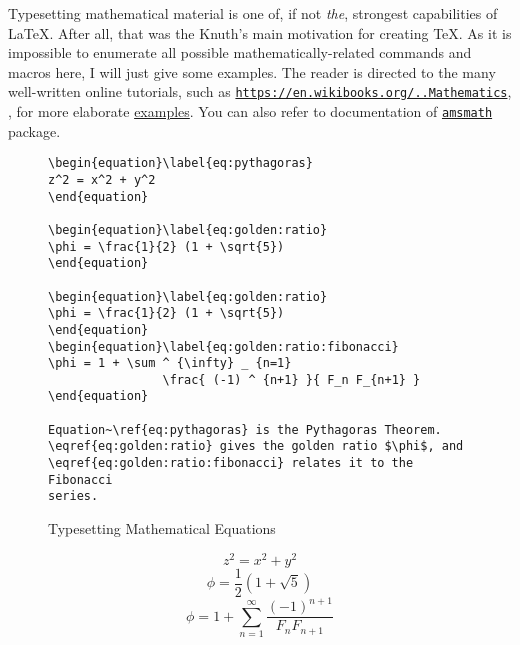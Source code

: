 Typesetting mathematical material is one of, if not \emph{the}, strongest capabilities of \LaTeX.  After all, that was the Knuth's main motivation for creating \TeX{}.  As it is impossible to enumerate all possible mathematically-related commands and macros here, I will just give some examples.  The reader is directed to the many well-written online tutorials, such as \href{https://en.wikibooks.org/wiki/LaTeX/Advanced_Mathematics}{\texttt{https://en.wikibooks.org/..Mathematics}}, \citet{roberts}, for more elaborate \href{https://www.andy-roberts.net/writing/latex}{examples}.  You can also refer to documentation of \href{http://texdoc.net/texmf-dist/doc/latex/amsmath/amsldoc.pdf}{\texttt{amsmath}} package. 

\begin{figure}[hb!]
\begin{lstlisting}
\begin{equation}\label{eq:pythagoras}
z^2 = x^2 + y^2
\end{equation}

\begin{equation}\label{eq:golden:ratio}
\phi = \frac{1}{2} (1 + \sqrt{5})
\end{equation}

\begin{equation}\label{eq:golden:ratio}
\phi = \frac{1}{2} (1 + \sqrt{5})
\end{equation}
\begin{equation}\label{eq:golden:ratio:fibonacci}
\phi = 1 + \sum ^ {\infty} _ {n=1}
                \frac{ (-1) ^ {n+1} }{ F_n F_{n+1} }
\end{equation}

Equation~\ref{eq:pythagoras} is the Pythagoras Theorem. 
\eqref{eq:golden:ratio} gives the golden ratio $\phi$, and 
\eqref{eq:golden:ratio:fibonacci} relates it to the Fibonacci 
series.
\end{lstlisting}
\caption{Typesetting Mathematical Equations}\label{fig:lst:equation}
\end{figure}

\begin{singlespace}
	\begin{equation}\label{eq:pythagoras}
	z^2 = x^2 + y^2
	\end{equation}
	\begin{equation}\label{eq:golden:ratio}
	\phi = \frac{1}{2} (1 + \sqrt{5})
	\end{equation}
	\begin{equation}\label{eq:golden:ratio:fibonacci}
	\phi = 1 + \sum ^ {\infty} _ {n=1}
	\frac{ (-1) ^ {n+1} }{ F_n F_{n+1} }
	\end{equation}	
\end{singlespace}

